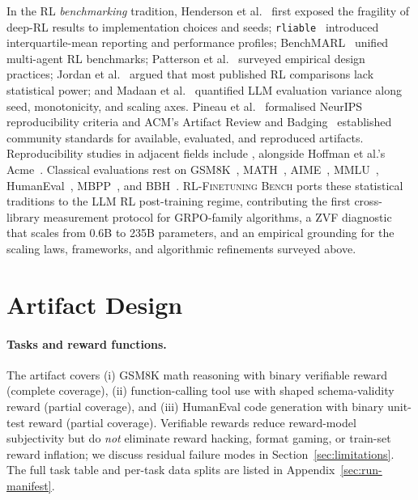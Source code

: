 \documentclass{article}
\newcommand{\ours}{\textsc{RL-Finetuning Bench}}
\begin{document}
In the RL \emph{benchmarking} tradition, Henderson et
al.~\cite{henderson2018deep} first exposed the fragility of deep-RL results
to implementation choices and seeds;
\texttt{rliable}~\cite{agarwal2021deep} introduced interquartile-mean
reporting and performance profiles; BenchMARL~\cite{bettini2023benchmarl}
unified multi-agent RL benchmarks; Patterson et
al.~\cite{patterson2024empirical} surveyed empirical design practices;
Jordan et al.~\cite{jordan2024benchmarking} argued that most published RL
comparisons lack statistical power; and Madaan et
al.~\cite{zhang2024benchvariance} quantified LLM evaluation variance along
seed, monotonicity, and scaling axes. Pineau et
al.~\cite{pineau2020improving} formalised NeurIPS reproducibility criteria
and ACM's Artifact Review and Badging~\cite{acm2020badges} established
community standards for available, evaluated, and reproduced artifacts.
Reproducibility studies in adjacent fields include
\cite{cavenaghi2023systematic, lynnerup2019survey, yamerenko2025generating, paparella2023reproducibility, huang2022state, lopezibañez2021reproducibility, leeser2026artifact, sedghpour2024artifact, colas2019hitchhiker}, alongside
Hoffman et al.'s Acme~\cite{hoffman2022acme}. Classical evaluations rest on
GSM8K~\cite{cobbe2021training}, MATH~\cite{hendrycks2021math},
AIME~\cite{maa2024aime}, MMLU~\cite{hendrycks2021mmlu},
HumanEval~\cite{chen2021codex}, MBPP~\cite{austin2021mbpp}, and
BBH~\cite{suzgun2023bbh}. \ours{} ports these statistical traditions to the
LLM RL post-training regime, contributing the first cross-library
measurement protocol for GRPO-family algorithms, a ZVF diagnostic that
scales from 0.6B to 235B parameters, and an empirical grounding for the
scaling laws, frameworks, and algorithmic refinements surveyed above.

 
\section{Artifact Design}
\label{sec:benchmark}


\paragraph{Tasks and reward functions.}
The artifact covers (i) GSM8K math reasoning with binary verifiable reward
(complete coverage), (ii) function-calling tool use with shaped
schema-validity reward (partial coverage), and (iii) HumanEval code
generation with binary unit-test reward (partial coverage). Verifiable
rewards reduce reward-model subjectivity but do \emph{not} eliminate
reward hacking, format gaming, or train-set reward inflation; we discuss
residual failure modes in Section~\ref{sec:limitations}. The full task
table and per-task data splits are listed in
Appendix~\ref{sec:run-manifest}.
\end{document}
